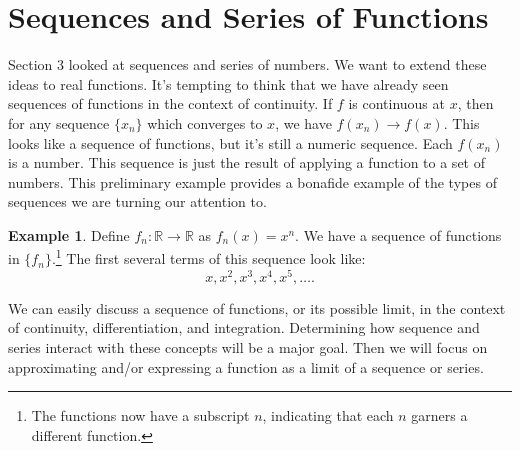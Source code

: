 \documentclass{article}
\newcommand{\R}{\mathbb{R}}
\theoremstyle{definition}
\newtheorem{example}{Example}[section]
\begin{document}
	\section{Sequences and Series of Functions}
	Section 3 looked at sequences and series of numbers. We want to extend these ideas to real functions. It's tempting to think that we have already seen sequences of functions in the context of continuity. If $ f $ is continuous at $ x $, then for any sequence $ \{x_n\} $ which converges to $ x $, we have $ f(x_n)\to f(x) $. This looks like a sequence of functions, but it's still a numeric sequence. Each $ f(x_n) $ is a number. This sequence is just the result of applying a function to a set of numbers. This preliminary example provides a bonafide example of the types of sequences we are turning our attention to.
	\begin{example}
		Define $ f_n:\R\to\R $ as $ f_n(x)=x^n $. We have a sequence of functions in $ \{f_n\} $.\footnote{The functions now have a subscript $ n $, indicating that each $ n $ garners a different function.} The first several terms of this sequence look like: $$ x,x^2,x^3,x^4,x^5,\ldots.$$
	\end{example} 
	We can easily discuss a sequence of functions, or its possible limit, in the context of continuity, differentiation, and integration. Determining how sequence and series interact with these concepts will be a major goal. Then we will focus on approximating and/or expressing a function as a limit of a sequence or series.  
\end{document}
